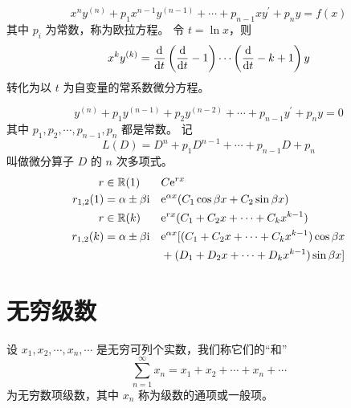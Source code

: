 \documentclass{ctexbook}
\def\diff{\textnormal{d}}
\def\e{\textnormal{e}}
\begin{document}
\begin{definition}[欧拉方程]
    \begin{equation}
        x^ny^{(n)}+p_1x^{n-1}y^{(n-1)}+\cdots+p_{n-1}xy^{\prime}+p_ny=f(x)
    \end{equation}
    其中 $p_i$ 为常数，称为欧拉方程。
    令 $t=\ln x$，则
    \begin{equation}
        x^ky^{(k)}=\frac{\diff}{\diff t}\left(\frac{\diff}{\diff t}-1\right)\cdots\left(\frac{\diff}{\diff t}-k+1\right)y
    \end{equation}
    转化为以 $t$ 为自变量的常系数微分方程。
\end{definition}

\begin{definition}[$n$ 阶常系数齐次线性微分方程]
    \begin{equation}
        y^{(n)}+p_1y^{(n-1)}+p_2y^{(n-2)}+\cdots+p_{n-1}y^\prime+p_ny=0
    \end{equation}
    其中 $p_1,p_2,\cdots,p_{n-1},p_n$ 都是常数。
    记
    \begin{equation}
        L(D)=D^n+p_1D^{n-1}+\cdots+p_{n-1}D+p_n
    \end{equation}
    叫做微分算子 $D$ 的 $n$ 次多项式。
    \begin{align}
        r &\in\mathbb{R} (1)&& C\e^{rx}\\
        r_{1,2} (1)&=\alpha\pm\beta\textnormal{i} && \e^{\alpha x}(C_1\cos\beta x+C_2\sin\beta x)\\
        r &\in\mathbb{R} (k)&& \e^{rx}(C_1+C_2x+\cdots+C_kx^{k-1})\\
        r_{1,2} (k)&=\alpha\pm\beta\textnormal{i} && \e^{\alpha x}[(C_1+C_2x+\cdots+C_kx^{k-1})\cos\beta x\nonumber\\
        &&&+(D_1+D_2x+\cdots+D_kx^{k-1})\sin\beta x]
    \end{align}
\end{definition}

\chapter{无穷级数}

\begin{definition}[无穷级数]
    设 $x_1,x_2,\cdots,x_n,\cdots$ 是无穷可列个实数，我们称它们的“和”
    \begin{equation}
        \sum_{n=1}^\infty x_n = x_1 + x_2 + \cdots + x_n + \cdots
    \end{equation}
    为无穷数项级数，其中 $x_n$ 称为级数的通项或一般项。
\end{definition}
\end{document}
